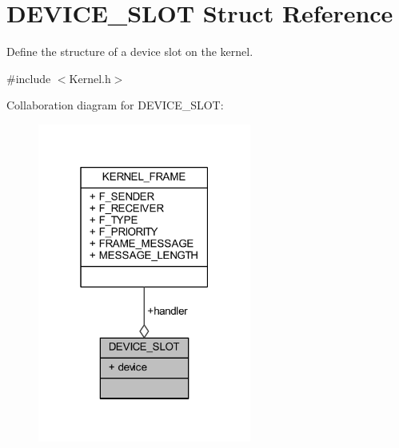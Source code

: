 \hypertarget{struct_d_e_v_i_c_e___s_l_o_t}{}\section{D\+E\+V\+I\+C\+E\+\_\+\+S\+L\+OT Struct Reference}
\label{struct_d_e_v_i_c_e___s_l_o_t}


Define the structure of a device slot on the kernel.  




{\ttfamily \#include $<$Kernel.\+h$>$}



Collaboration diagram for D\+E\+V\+I\+C\+E\+\_\+\+S\+L\+OT\+:
\nopagebreak
\begin{figure}[H]
\begin{center}
\leavevmode
\includegraphics[width=199pt]{struct_d_e_v_i_c_e___s_l_o_t__coll__graph}
\end{center}
\end{figure}
